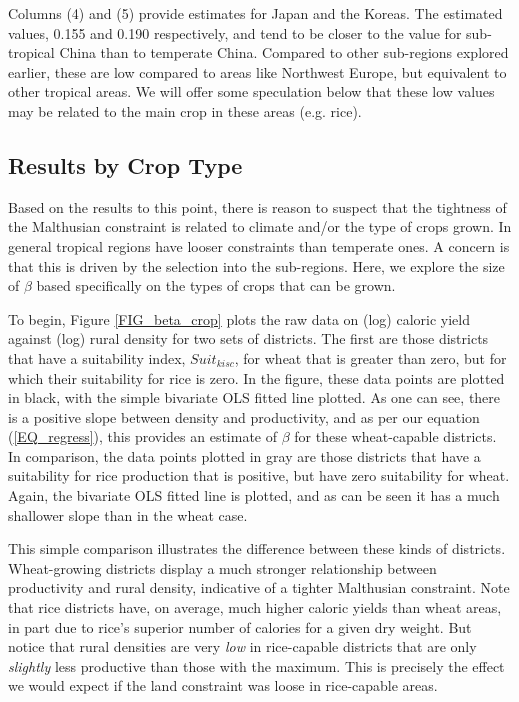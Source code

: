 \documentclass[11pt]{article}
\begin{document}
Columns (4) and (5) provide estimates for Japan and the Koreas. The estimated values, 0.155 and 0.190 respectively, and tend to be closer to the value for sub-tropical China than to temperate China. Compared to other sub-regions explored earlier, these are low compared to areas like Northwest Europe, but equivalent to other tropical areas. We will offer some speculation below that these low values may be related to the main crop in these areas (e.g. rice).

\subsection{Results by Crop Type}
Based on the results to this point, there is reason to suspect that the tightness of the Malthusian constraint is related to climate and/or the type of crops grown. In general tropical regions have looser constraints than temperate ones. A concern is that this is driven by the selection into the sub-regions. Here, we explore the size of $\beta$ based specifically on the types of crops that can be grown.

To begin, Figure \ref{FIG_beta_crop} plots the raw data on (log) caloric yield against (log) rural density for two sets of districts. The first are those districts that have a suitability index, $Suit_{kisc}$, for wheat that is greater than zero, but for which their suitability for rice is zero. In the figure, these data points are plotted in black, with the simple bivariate OLS fitted line plotted. As one can see, there is a positive slope between density and productivity, and as per our equation (\ref{EQ_regress}), this provides an estimate of $\beta$ for these wheat-capable districts. In comparison, the data points plotted in gray are those districts that have a suitability for rice production that is positive, but have zero suitability for wheat. Again, the bivariate OLS fitted line is plotted, and as can be seen it has a much shallower slope than in the wheat case.

This simple comparison illustrates the difference between these kinds of districts. Wheat-growing districts display a much stronger relationship between productivity and rural density, indicative of a tighter Malthusian constraint. Note that rice districts have, on average, much higher caloric yields than wheat areas, in part due to rice's superior number of calories for a given dry weight. But notice that rural densities are very \textit{low} in rice-capable districts that are only \textit{slightly} less productive than those with the maximum. This is precisely the effect we would expect if the land constraint was loose in rice-capable areas. 
\end{document}
